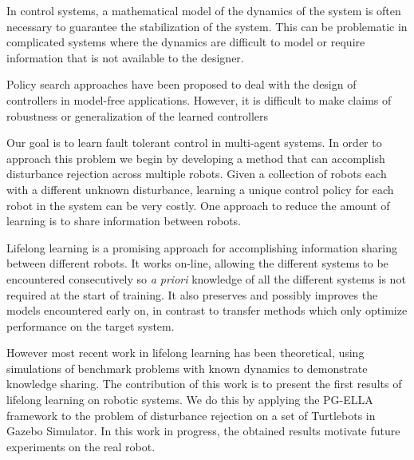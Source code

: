 \documentclass{aamas2016}
\begin{document}
%

In control systems, a mathematical model of the dynamics of the system is often necessary to guarantee the stabilization of the system. This can be problematic in complicated systems where the dynamics are difficult to model or require information that is not available to the designer. %


Policy search approaches have been proposed to deal with the design of controllers in model-free applications.
However, it is difficult to make claims of robustness or generalization of the learned controllers 

Our goal is to learn fault tolerant control in multi-agent systems. In order to approach this problem we begin by developing a method that can accomplish disturbance rejection across multiple robots. 
Given a collection of robots each with a different unknown disturbance, learning a unique control policy for each robot in the system can be very costly. One approach to reduce the amount of learning is to share information between robots. 

Lifelong learning \cite{Ruvolo2013} is a promising approach for accomplishing information sharing between different robots. It works on-line, allowing the different systems to be encountered consecutively so \textit{a priori} knowledge of all the different systems is not required at the start of training. It also preserves and possibly improves the models encountered early on, in contrast to transfer methods which only optimize performance on the target system.

However most recent work in lifelong learning \cite{Ruvolo2013,BouAmmar2014a,bouAmmar2015unsupervised} has been theoretical, using simulations of benchmark problems with known dynamics to demonstrate knowledge sharing. The contribution of this work is to present the first results of lifelong learning on robotic systems. We do this by applying the PG-ELLA framework \cite{BouAmmar2014a} to the problem of disturbance rejection on a set of Turtlebots in Gazebo Simulator. In this work in progress, the obtained results motivate future experiments on the real robot. 
\end{document}
